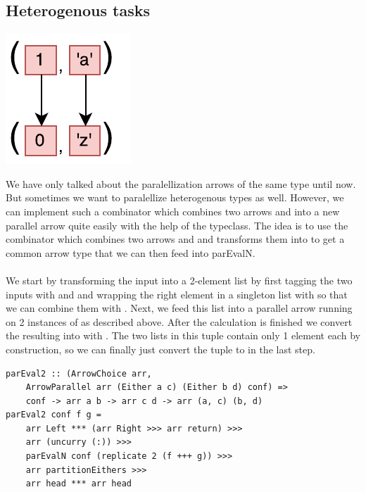 \subsection{Heterogenous tasks}
\begin{center}
	\includegraphics[scale=0.7]{images/parEval2}
\end{center}
We have only talked about the paralellization arrows of the same type until now. But sometimes we want to paralellize heterogenous types as well. However, we can implement such a  combinator which combines two arrows  and  into a new parallel arrow  quite easily with the help of the  typeclass. The idea is to use the \code{+++} combinator which combines two arrows  and  and transforms them into  to get a common arrow type that we can then feed into parEvalN.
\\\\
We start by transforming the  input into a 2-element list \code{[Either a c]} by first tagging the two inputs with  and  and wrapping the right element in a singleton list with  so that we can combine them with . Next, we feed this list into a parallel arrow running on 2 instances of  as described above. After the calculation is finished we convert the resulting \code{[Either b d]} into \code{([b], [d])} with . The two lists in this tuple contain only 1 element each by construction, so we can finally just convert the tuple to  in the last step.
\begin{lstlisting}[frame=htrbl]
parEval2 :: (ArrowChoice arr,
	ArrowParallel arr (Either a c) (Either b d) conf) =>
	conf -> arr a b -> arr c d -> arr (a, c) (b, d)
parEval2 conf f g = 
	arr Left *** (arr Right >>> arr return) >>>
	arr (uncurry (:)) >>>
	parEvalN conf (replicate 2 (f +++ g)) >>>
	arr partitionEithers >>>
	arr head *** arr head
\end{lstlisting}


